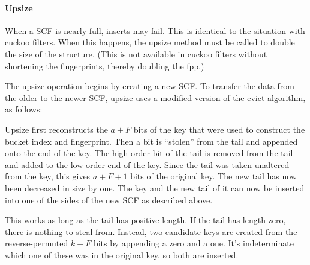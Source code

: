 \documentclass[letterpaper,twocolumn,10pt]{article}
\newcommand{\ints}{\mathbb{Z}}
\newcommand{\dotcup}{\ensuremath{\mathaccent\cdot\cup}}
\newcommand{\TCF}{SCF}
\newcommand{\TCF}{TCF}
\begin{document}



\paragraph{Upsize}
When a \TCF{} is nearly full, inserts may fail.
This is identical to the situation with cuckoo filters.
When this happens, the upsize method must be called to double the size of the structure. %
(This is not available in cuckoo filters without shortening the fingerprints, thereby doubling the fpp.)

The upsize operation begins by creating a new \TCF{}. %
To transfer the data from the older to the newer \TCF{}, upsize uses a modified version of the evict algorithm, as follows:

Upsize first reconstructs the $a+F$ bits of the key that were used to construct the bucket index and fingerprint. %
Then a bit is ``stolen'' from the tail and appended onto the end of the key. %
The high order bit of the tail is removed from the tail and added to the low-order end of the key.
Since the tail was taken unaltered from the key, this gives $a+F+1$ bits of the original key.
The new tail has now been decreased in size by one.
The key and the new tail of it can now be inserted into one of the sides of the new \TCF{} as described above. %

This works as long as the tail has positive length.
If the tail has length zero, there is nothing to steal from.
Instead, two candidate keys are created from the reverse-permuted $k+F$ bits by appending a zero and a one. %
It's indeterminate which one of these was in the original key, so both are inserted. %
\end{document}
